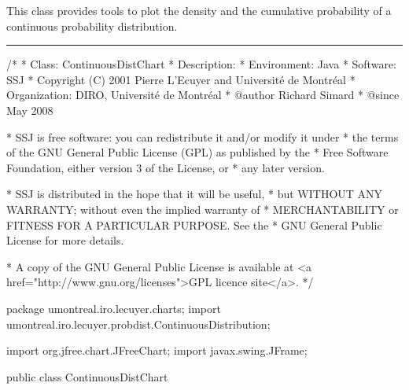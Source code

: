 
This class provides tools to plot the density and the cumulative probability
 of a continuous probability distribution.


\bigskip\hrule
\begin{code}
\begin{hide}
/*
 * Class:        ContinuousDistChart
 * Description:  
 * Environment:  Java
 * Software:     SSJ 
 * Copyright (C) 2001  Pierre L'Ecuyer and Université de Montréal
 * Organization: DIRO, Université de Montréal
 * @author       Richard Simard
 * @since        May 2008

 * SSJ is free software: you can redistribute it and/or modify it under
 * the terms of the GNU General Public License (GPL) as published by the
 * Free Software Foundation, either version 3 of the License, or
 * any later version.

 * SSJ is distributed in the hope that it will be useful,
 * but WITHOUT ANY WARRANTY; without even the implied warranty of
 * MERCHANTABILITY or FITNESS FOR A PARTICULAR PURPOSE.  See the
 * GNU General Public License for more details.

 * A copy of the GNU General Public License is available at
   <a href="http://www.gnu.org/licenses">GPL licence site</a>.
 */
\end{hide}
package umontreal.iro.lecuyer.charts;
   import umontreal.iro.lecuyer.probdist.ContinuousDistribution;\begin{hide}

import org.jfree.chart.JFreeChart;
import javax.swing.JFrame;
\end{hide}


public class ContinuousDistChart \begin{hide} {
   protected ContinuousDistribution dist;
   protected double a,b;
   protected int m;
   protected XYLineChart cdfChart;
   protected XYLineChart densityChart;

   private void init() {
      double[][] cdf = new double[2][m+1];
      double[][] density = new double[2][m+1];
      double h = (b - a) / m;
      double x;
      int coex = 0;

      try {
         for (int i = 0; i <= m; i++) {
            x = a + i*h;
            cdf[0][i] = x;
            cdf[1][i] = dist.cdf (x);
         }
         cdfChart = new XYLineChart("cdf: " + dist.toString(), "", "", cdf);
      } catch (UnsupportedOperationException e) {
         coex++;
         System.err.println (e);
//         e.printStackTrace();
      }

      try {
         for (int i = 0; i <= m; i++) {
            x = a + i*h;
            density[0][i] = x;
            density[1][i] = dist.density (x);
         }
         densityChart = new XYLineChart("density: " + dist.toString(),
                                        "", "", density);
      } catch (UnsupportedOperationException e) {
         System.err.println (e);
         if (coex == 1)
            throw e;
      }
      cdfChart.setprobFlag (true);
      densityChart.setprobFlag (true);
   }
\end{hide}\end{code}

